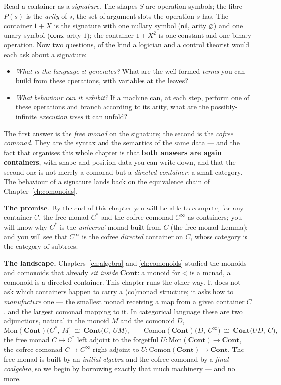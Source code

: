 \documentclass[11pt,a4paper]{book}
\newcommand{\Cont}{\mathbf{Cont}}
\newcommand{\Mon}{\mathrm{Mon}}
\newcommand{\Comon}{\mathrm{Comon}}
\theoremstyle{plain}
\theoremstyle{definition}
\theoremstyle{remark}
\begin{document}
Read a container as a \emph{signature}. The shapes $S$ are operation symbols; the fibre
$P(s)$ is the \emph{arity} of $s$, the set of argument slots the operation $s$ has. The
container $1+X$ is the signature with one nullary symbol ($\mathsf{nil}$, arity
$\varnothing$) and one unary symbol ($\mathsf{cons}$, arity $1$); the container $1+X^{2}$
is one constant and one binary operation. Now two questions, of the kind a logician and a
control theorist would each ask about a signature:
\begin{itemize}[nosep]
  \item \emph{What is the language it generates?} What are the well-formed \emph{terms} you
        can build from these operations, with variables at the leaves?
  \item \emph{What behaviour can it exhibit?} If a machine can, at each step, perform one of
        these operations and branch according to its arity, what are the possibly-infinite
        \emph{execution trees} it can unfold?
\end{itemize}
The first answer is the \emph{free monad} on the signature; the second is the \emph{cofree
comonad}. They are the syntax and the semantics of the same data --- and the fact that
organises this whole chapter is that \textbf{both answers are again containers}, with shape
and position data you can write down, and that the second one is not merely a comonad but a
\emph{directed container}: a small category. The behaviour of a signature lands back on the
equivalence chain of Chapter~\ref{ch:comonoids}.

\medskip
\noindent\textbf{The promise.} By the end of this chapter you will be able to compute, for
any container $C$, the free monad $C^{*}$ and the cofree comonad $C^{\infty}$ as containers;
you will know why $C^{*}$ is the \emph{universal} monad built from $C$ (the free-monad
Lemma); and you will see that $C^{\infty}$ is the cofree \emph{directed} container on $C$,
whose category is the category of subtrees.

\medskip
\noindent\textbf{The landscape.} Chapters~\ref{ch:algebra} and \ref{ch:comonoids} studied
the monoids and comonoids that already \emph{sit inside} $\Cont$: a monoid for
$\triangleleft$ is a monad, a comonoid is a directed container. This chapter runs the other
way. It does not ask which containers happen to carry a (co)monad structure; it asks how to
\emph{manufacture} one --- the smallest monad receiving a map from a given container $C$, and
the largest comonad mapping to it. In categorical language these are two adjunctions, natural
in the monoid $M$ and the comonoid $D$,
\[
  \Mon(\Cont)\big(C^{*},\ M\big)\ \cong\ \Cont\big(C,\ U M\big),
  \qquad
  \Comon(\Cont)\big(D,\ C^{\infty}\big)\ \cong\ \Cont\big(U D,\ C\big),
\]
the free monad $C\mapsto C^{*}$ left adjoint to the forgetful $U\colon\Mon(\Cont)\to\Cont$,
the cofree comonad $C\mapsto C^{\infty}$ right adjoint to $U\colon\Comon(\Cont)\to\Cont$. The
free monad is built by an \emph{initial algebra} and the cofree comonad by a \emph{final
coalgebra}, so we begin by borrowing exactly that much machinery --- and no more.
\end{document}
